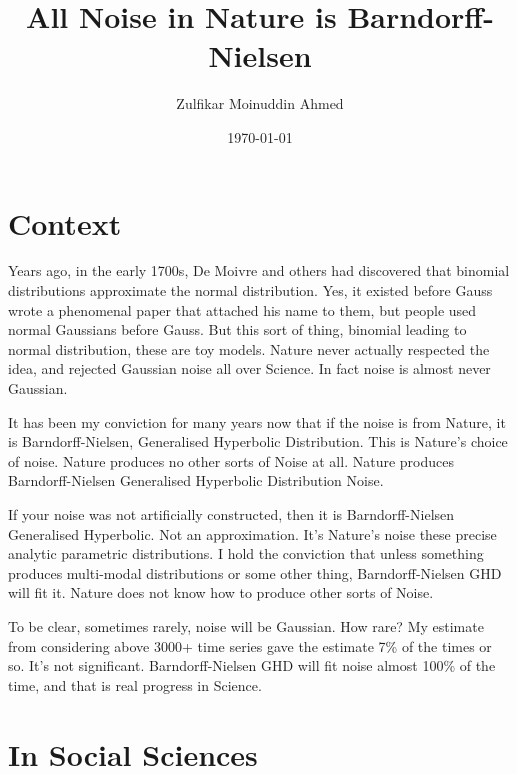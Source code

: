 \documentclass{amsart}
\title{All Noise in Nature is Barndorff-Nielsen}
\author{Zulfikar Moinuddin Ahmed}
\date{\today}
\begin{document}
\maketitle

\section{Context}

Years ago, in the early 1700s, De Moivre and others had discovered that binomial distributions approximate the normal distribution.  Yes, it existed before Gauss wrote a phenomenal paper that attached his name to them, but people used normal Gaussians before Gauss.  But this sort of thing, binomial leading to normal distribution, these are toy models.  Nature never actually respected the idea, and rejected Gaussian noise all over Science.  In fact noise is almost never Gaussian.  

It has been my conviction for many years now that if the noise is from Nature, it is Barndorff-Nielsen, Generalised Hyperbolic Distribution.  This is Nature's choice of noise.  Nature produces no other sorts of Noise at all.  Nature produces Barndorff-Nielsen Generalised Hyperbolic Distribution Noise.

If your noise was not artificially constructed, then it is Barndorff-Nielsen Generalised Hyperbolic.  Not an approximation.  It's Nature's noise these precise analytic parametric distributions.  I hold the conviction that unless something produces multi-modal distributions or some other thing, Barndorff-Nielsen GHD will fit it.  Nature does not know how to produce other sorts of Noise.

To be clear, sometimes rarely, noise will be Gaussian. How rare?  My estimate from considering above 3000+ time series gave the estimate 7\% of the times or so.  It's not significant.  Barndorff-Nielsen GHD will fit noise almost 100\% of the time, and that is real progress in Science.  

\section{In Social Sciences}
\end{document}
